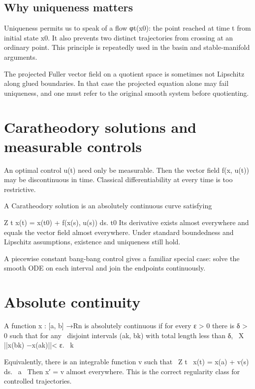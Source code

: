 \subsection{Why uniqueness matters}

Uniqueness permits us to speak of a flow φt(x0): the point reached at time t from initial state x0. It also prevents two distinct trajectories from crossing at an ordinary point. This principle is repeatedly used in the basin and stable-manifold arguments.


The projected Fuller vector field on a quotient space is sometimes not Lipschitz along glued boundaries. In that case the projected equation alone may fail uniqueness, and one must refer to the original smooth system before quotienting.


\section{Caratheodory solutions and measurable controls}

An optimal control u(t) need only be measurable. Then the vector field f(x, u(t)) may be discontinuous in time. Classical differentiability at every time is too restrictive.


A Caratheodory solution is an absolutely continuous curve satisfying


Z t x(t) = x(t0) + f(x(s), u(s)) ds. t0 Its derivative exists almost everywhere and equals the vector field almost everywhere. Under standard boundedness and Lipschitz assumptions, existence and uniqueness still hold.


A piecewise constant bang-bang control gives a familiar special case: solve the smooth ODE on each interval and join the endpoints continuously.


\section{Absolute continuity}

\begin{displaytext}
A function x : [a, b] →Rn is absolutely continuous if for every ε > 0 there is δ > 0 such that for any \
disjoint intervals (ak, bk) with total length less than δ, \
X ||x(bk) −x(ak)||< ε. \
k
\end{displaytext}

\begin{displaytext}
Equivalently, there is an integrable function v such that \
Z t \
x(t) = x(a) + v(s) ds. \
a \
Then x′ = v almost everywhere. This is the correct regularity class for controlled trajectories.
\end{displaytext}

